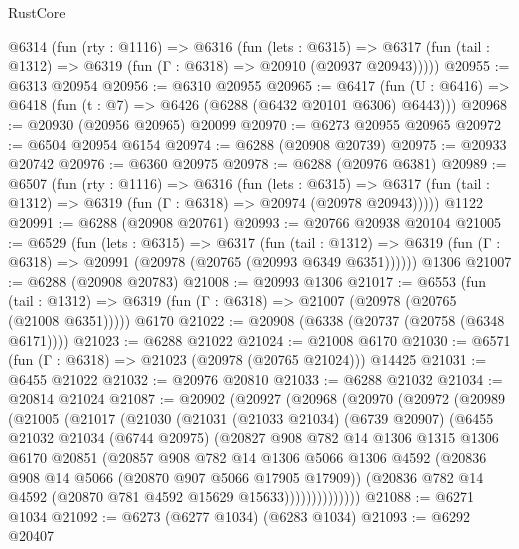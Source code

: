 \begin{lexlean}{RustCore}
\begin{coremodule}
  @6314
    (fun (rty : @1116) =>
    @6316
      (fun (lets : @6315) =>
      @6317 (fun (tail : @1312) => @6319 (fun (Γ : @6318) => @20910 (@20937 @20943)))))
@20955 := @6313 @20954
@20956 := @6310 @20955
@20965 := @6417
    (fun (U : @6416) => @6418 (fun (t : @7) => @6426 (@6288 (@6432 @20101 @6306) @6443)))
@20968 := @20930 (@20956 @20965) @20099
@20970 := @6273 @20955 @20965
@20972 := @6504 @20954 @6154
@20974 := @6288 (@20908 @20739)
@20975 := @20933 @20742
@20976 := @6360 @20975
@20978 := @6288 (@20976 @6381)
@20989 := @6507
    (fun (rty : @1116) =>
    @6316
      (fun (lets : @6315) =>
      @6317 (fun (tail : @1312) => @6319 (fun (Γ : @6318) => @20974 (@20978 @20943)))))
    @1122
@20991 := @6288 (@20908 @20761)
@20993 := @20766 @20938 @20104
@21005 := @6529
    (fun (lets : @6315) =>
    @6317
      (fun (tail : @1312) =>
      @6319 (fun (Γ : @6318) => @20991 (@20978 (@20765 (@20993 @6349 @6351))))))
    @1306
@21007 := @6288 (@20908 @20783)
@21008 := @20993 @1306
@21017 := @6553
    (fun (tail : @1312) => @6319 (fun (Γ : @6318) => @21007 (@20978 (@20765 (@21008 @6351)))))
    @6170
@21022 := @20908 (@6338 (@20737 (@20758 (@6348 @6171))))
@21023 := @6288 @21022
@21024 := @21008 @6170
@21030 := @6571 (fun (Γ : @6318) => @21023 (@20978 (@20765 @21024))) @14425
@21031 := @6455 @21022
@21032 := @20976 @20810
@21033 := @6288 @21032
@21034 := @20814 @21024
@21087 := @20902
    (@20927
      (@20968
        (@20970
          (@20972
            (@20989
              (@21005
                (@21017
                  (@21030
                    (@21031
                      (@21033 @21034)
                      (@6739 @20907)
                      (@6455
                        @21032
                        @21034
                        (@6744 @20975)
                        (@20827
                          @908
                          @782
                          @14
                          @1306
                          @1315
                          @1306
                          @6170
                          @20851
                          (@20857
                            @908
                            @782
                            @14
                            @1306
                            @5066
                            @1306
                            @4592
                            (@20836 @908 @14 @5066 (@20870 @907 @5066 @17905 @17909))
                            (@20836 @782 @14 @4592 (@20870 @781 @4592 @15629 @15633))))))))))))))
@21088 := @6271 @1034
@21092 := @6273 (@6277 @1034) (@6283 @1034)
@21093 := @6292 @20407

\end{coremodule}
\end{lexlean}
